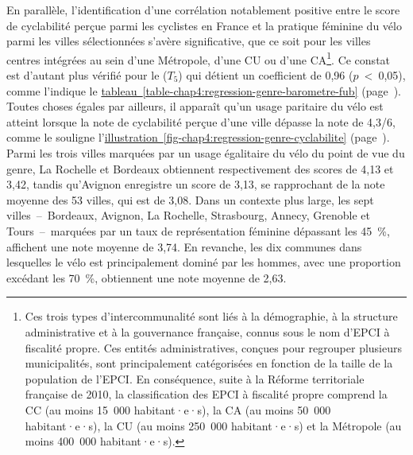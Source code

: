 \begin{refsegment}
En parallèle, l'identification d'une corrélation notablement positive entre le score de cyclabilité perçue parmi les cyclistes en France et la pratique féminine du vélo parmi les villes sélectionnées s'avère significative, que ce soit pour les villes centres intégrées au sein d'une Métropole, d'une \acrfull{CU} ou d'une \acrfull{CA}\footnote{
    Ces trois types d'intercommunalité sont liés à la démographie, à la structure administrative et à la gouvernance française, connus sous le nom d'\acrfull{EPCI} à fiscalité propre. Ces entités administratives, conçues pour regrouper plusieurs municipalités, sont principalement catégorisées en fonction de la taille de la population de l'\acrshort{EPCI}. En conséquence, suite à la Réforme territoriale française de 2010, la classification des \acrshort{EPCI} à fiscalité propre comprend la \acrfull{CC} (au moins 15~000 habitant·e·s), la \acrfull{CA} (au moins 50~000 habitant·e·s), la \acrfull{CU} (au moins 250~000 habitant·e·s) et la Métropole (au moins 400~000 habitant·e·s).
}. Ce constat est d'autant plus vérifié pour le  (\(T_{5}\)) qui détient un coefficient de 0,96 ($p$~\textless~0,05), comme l'indique le \hyperref[table-chap4:regression-genre-barometre-fub]{tableau~\ref{table-chap4:regression-genre-barometre-fub}} (page~\pageref{table-chap4:regression-genre-barometre-fub}). Toutes choses égales par ailleurs, il apparaît qu'un usage paritaire du vélo est atteint lorsque la note de cyclabilité perçue d'une ville dépasse la note de 4,3/6, comme le souligne l'\hyperref[fig-chap4:regression-genre-cyclabilite]{illustration~\ref{fig-chap4:regression-genre-cyclabilite}} (page~\pageref{fig-chap4:regression-genre-cyclabilite}). Parmi les trois villes marquées par un usage égalitaire du vélo du point de vue du genre, La Rochelle et Bordeaux obtiennent respectivement des scores de 4,13 et 3,42, tandis qu'Avignon enregistre un score de 3,13, se rapprochant de la note moyenne des 53 villes, qui est de 3,08. Dans un contexte plus large, les sept villes~–~Bordeaux, Avignon, La Rochelle, Strasbourg, Annecy, Grenoble et Tours~–~marquées par un taux de représentation féminine dépassant les 45~\%, affichent une note moyenne de 3,74. En revanche, les dix communes dans lesquelles le vélo est principalement dominé par les hommes, avec une proportion excédant les 70~\%, obtiennent une note moyenne de 2,63.%


\end{refsegment}
